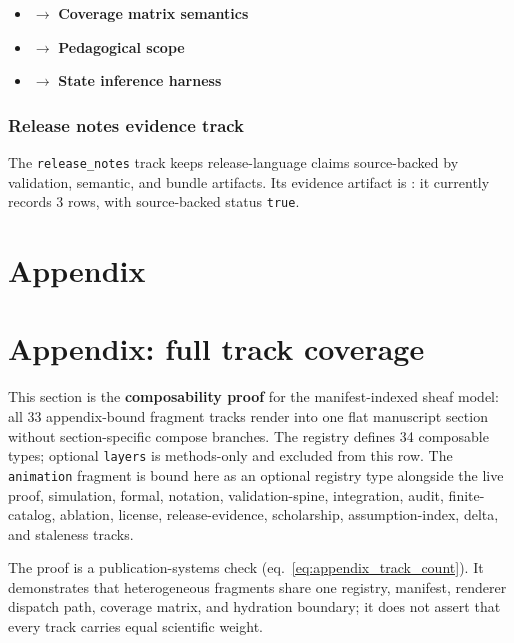 \documentclass[
  english,
]{article}
\providecommand{\tightlist}{%
  \setlength{\itemsep}{0pt}\setlength{\parskip}{0pt}}
\begin{document}
\begin{itemize}
\tightlist
\item
   \texorpdfstring{\ensuremath{\to}}{->} \textbf{Coverage matrix semantics}
\item
   \texorpdfstring{\ensuremath{\to}}{->} \textbf{Pedagogical scope}
\item
   \texorpdfstring{\ensuremath{\to}}{->} \textbf{State inference harness}
\end{itemize}

\subsubsection{Release notes evidence
track}\label{release-notes-evidence-track}

The \texttt{release\_notes} track keeps release-language claims
source-backed by validation, semantic, and bundle artifacts. Its
evidence artifact is
: it currently
records 3 rows, with source-backed status \texttt{true}.

\newpage

{}
\section*{Appendix}

\section{Appendix: full track coverage}\label{sec:appendix_full_sheaf}

This section is the \textbf{composability proof} for the
manifest-indexed sheaf model: all 33 appendix-bound fragment tracks
render into one flat manuscript section without section-specific compose
branches. The registry defines 34 composable types; optional
\texttt{layers} is methods-only and excluded from this row. The
\texttt{animation} fragment is bound here as an optional registry type
alongside the live proof, simulation, formal, notation,
validation-spine, integration, audit, finite-catalog, ablation, license,
release-evidence, scholarship, assumption-index, delta, and staleness
tracks.

The proof is a publication-systems check
(eq.~\ref{eq:appendix_track_count}). It demonstrates that heterogeneous
fragments share one registry, manifest, renderer dispatch path, coverage
matrix, and hydration boundary; it does not assert that every track
carries equal scientific weight.
\end{document}
